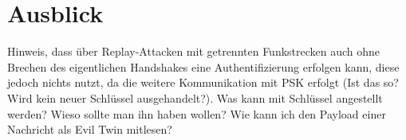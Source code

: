 \section{Ausblick}
Hinweis, dass über Replay-Attacken mit getrennten Funkstrecken auch ohne Brechen des eigentlichen Handshakes eine Authentifizierung erfolgen kann, diese jedoch nichts nutzt, da die weitere Kommunikation mit PSK erfolgt (Ist das so? Wird kein neuer Schlüssel ausgehandelt?).
Was kann mit Schlüssel angestellt werden? Wieso sollte man ihn haben wollen? 
Wie kann ich den Payload einer Nachricht als Evil Twin mitlesen? 